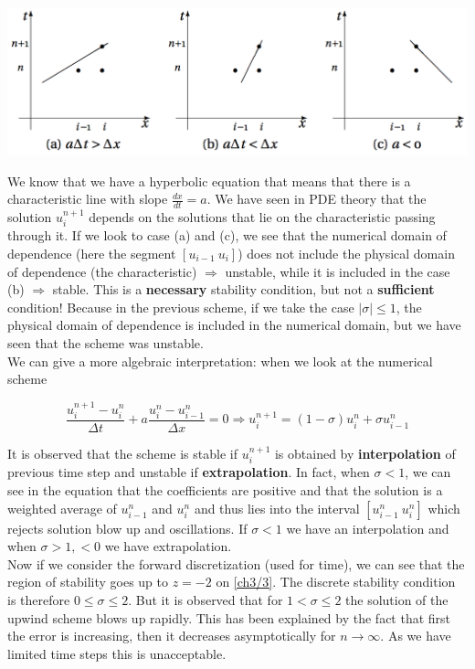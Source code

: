\begin{center}
\includegraphics[scale=0.5]{ch3/7}
\end{center}

We know that we have a hyperbolic equation that means that there is a characteristic line with slope $\frac{dx}{dt} = a$. We have seen in PDE theory that the solution $u^{n+1}_i$ depends on the solutions that lie on the characteristic passing through it. If we look to case (a) and (c), we see that the numerical domain of dependence (here the segment $[u_{i-1} \ u_i]$) does not include the physical domain of dependence (the characteristic) $\Rightarrow$ unstable, while it is included in the case (b) $\Rightarrow$ stable. This is a \textbf{necessary} stability condition, but not a \textbf{sufficient} condition! Because in the previous scheme, if we take the case $|\sigma| \leq 1 $, the physical domain of dependence is included in the numerical domain, but we have seen that the scheme was unstable.\\

 We can give a more algebraic interpretation: when we look at the numerical scheme 

\begin{equation}
\frac{u_i ^{n+1} - u_i ^n}{\Delta t} + a \frac{u_i ^n - u_{i-1}^n}{\Delta x} = 0 \Rightarrow u_i ^{n+1} = (1-\sigma ) u_i ^n + \sigma u _{i-1}^n
\end{equation}

It is observed that the scheme is stable if $u_i^{n+1}$ is obtained by \textbf{interpolation }of previous time step and unstable if \textbf{extrapolation}. In fact, when $\sigma <1$, we can see in the equation that the coefficients are positive and that the solution is a weighted average of $u^n_{i-1}$ and $u^n_{i}$ and thus lies into the interval $[u^n_{i-1}\ u^n_{i}]$ which rejects solution blow up and oscillations.  If $\sigma < 1$ we have an interpolation and when $\sigma >1, <0$ we have extrapolation. \\

Now if we consider the forward discretization (used for time), we can see that the region of stability goes up to $z=-2$ on \autoref{ch3/3}. The discrete stability condition is therefore $0\leq \sigma \leq 2$. But it is observed that for $1< \sigma \leq 2$ the solution of the upwind scheme blows up rapidly. This has been explained by the fact that first the error is increasing, then it decreases asymptotically for $n\rightarrow \infty$. As we have limited time steps this is unacceptable. 

